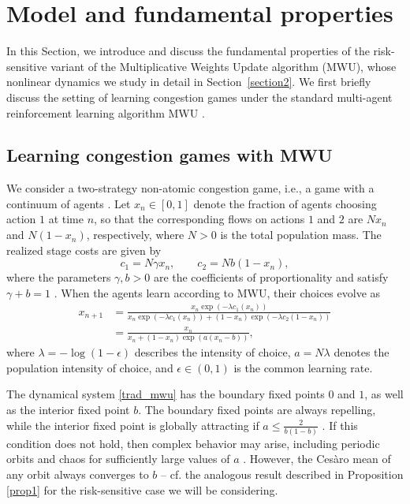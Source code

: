 \documentclass{article}
\theoremstyle{plain}
\theoremstyle{definition}
\begin{document}
\section{Model and fundamental properties}
\label{section1}
In this Section, we introduce and discuss the fundamental properties of the risk-sensitive variant of the Multiplicative Weights Update algorithm (MWU), whose nonlinear dynamics we study in detail in Section~\ref{section2}. We first briefly discuss the setting of learning congestion games under the standard multi-agent reinforcement learning algorithm MWU \cite{palaiopanos,arora}.

\subsection{Learning congestion games with MWU}\label{subsec2.1}
We consider a two-strategy non-atomic congestion game, i.e., a game with a continuum of agents \cite{bailey,cheung2}. Let \(x_n\in[0,1]\) denote the fraction of agents choosing action \(1\) at time \(n\), so that the corresponding flows on actions \(1\) and \(2\) are \(Nx_n\) and \(N(1-x_n)\), respectively, where \(N>0\) is the total population mass. The realized stage costs are given by
\begin{equation}
c_1=N\gamma x_n, \qquad c_2=Nb(1-x_n),
\label{eq00}
\end{equation}
where the parameters \(\gamma,b>0\) are the coefficients of proportionality and satisfy \(\gamma+b=1\) \cite{bielawski3}. When the agents learn according to MWU, their choices evolve as
\begin{align} x_{n+1}&=\frac{x_n \exp{\left(-\lambda c_1(x_n) \right)}}{x_n\exp{\left(-\lambda c_1(x_n) \right)}+(1-x_n) \exp{\left(-\lambda c_2(1-x_n) \right)}} \nonumber\\ &=\frac{x_n}{x_n+(1-x_n) \exp{\left(a(x_n-b) \right)}}, \label{trad_mwu} 
\end{align}
where \(\lambda=-\log(1-\epsilon)\) describes the intensity of choice, \(a=N\lambda\) denotes the population intensity of choice, and \(\epsilon\in(0,1)\) is the common learning rate.

The dynamical system \eqref{trad_mwu} has the boundary fixed points \(0\) and \(1\), as well as the interior fixed point \(b\). The boundary fixed points are always repelling, while the interior fixed point is globally attracting if \(a\leq\frac{2}{b(1-b)}\) \cite{chotibut1}. If this condition does not hold, then complex behavior may arise, including periodic orbits and chaos for sufficiently large values of $a$ \cite{chotibut1}. However, the Cesàro mean of any orbit always converges to \(b\) \cite{chotibut1}-- cf. the analogous result described in Proposition \ref{prop1} for the risk-sensitive case we will be considering.
\end{document}

